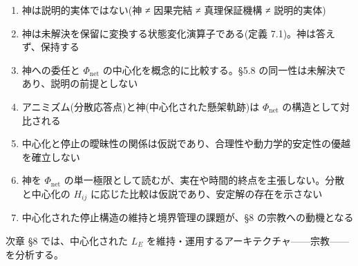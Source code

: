 \begin{enumerate}
\item 神は説明的実体ではない(神 ≠ 因果完結 ≠ 真理保証機構 ≠ 説明的実体)
\item 神は未解決を保留に変換する状態変化演算子である(定義 7.1)。神は答えず、保持する
\item 神への委任と $\Phi_{\text{net}}$ の中心化を概念的に比較する。\S{}5.8 の同一性は未解決であり、説明の前提としない
\item アニミズム(分散応答点)と神(中心化された懸架軌跡)は $\Phi_{\text{net}}$ の構造として対比される
\item 中心化と停止の曖昧性の関係は仮説であり、合理性や動力学的安定性の優越を確立しない
\item 神を $\Phi_{\text{net}}$ の単一極限として読むが、実在や時間的終点を主張しない。分散と中心化の $H_{ij}$ に応じた比較は仮説であり、安定解の存在を示さない
\item 中心化された停止構造の維持と境界管理の課題が、\S{}8 の宗教への動機となる
\end{enumerate}


次章 \S{}8 では、中心化された $L_E$ を維持・運用するアーキテクチャ——宗教——を分析する。

\bigskip
